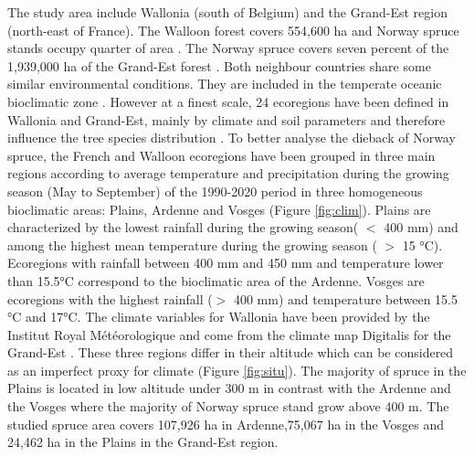 \documentclass[3p,procedia]{elsarticle}
\begin{document}
The study area include Wallonia (south of Belgium) and the Grand-Est region (north-east of France).
The Walloon forest covers 554,600 ha and  Norway spruce stands occupy quarter of area \citep{lejeune_ep_2022}.  
The Norway spruce covers seven percent of the 1,939,000 ha of the Grand-Est forest \citep{IGN2022}. 
Both neighbour countries share some similar environmental conditions.
They are included in the temperate oceanic bioclimatic zone \citep{lindner_climate_2010}.
However at a finest scale, 24 ecoregions have been defined in  Wallonia and Grand-Est, mainly by climate and soil parameters and therefore influence the tree species distribution \citep{walthert_tree_2017}.
To better analyse the dieback of Norway spruce, the French and Walloon ecoregions have been grouped in three main regions according to average temperature and precipitation during the growing season (May to September) of the 1990-2020 period in three homogeneous bioclimatic areas: Plains, Ardenne and Vosges (Figure \ref{fig:clim}).
Plains are characterized by the lowest rainfall during the growing season( $<$ 400 mm) and among the highest mean temperature during the growing season ( $>$ 15 °C).
Ecoregions with rainfall between 400 mm and 450 mm and temperature lower than 15.5°C correspond to the bioclimatic area of the Ardenne.
Vosges are ecoregions with the highest rainfall ($>$ 400 mm) and temperature between 15.5 °C and 17°C.
The climate variables for Wallonia have been provided by the Institut Royal Météorologique and come from the climate map Digitalis for the Grand-Est \citep{piedallu_presentation_2014}.
These three regions differ in their altitude which can be considered as an imperfect proxy for climate (Figure \ref{fig:situ}). 
The majority of spruce in the Plains is located in low altitude under 300 m in contrast with the Ardenne and the Vosges where the majority of Norway spruce stand grow above 400 m. 
The studied spruce area covers 107,926 ha in Ardenne,75,067 ha in the Vosges and  24,462 ha in the Plains in the Grand-Est region.
\end{document}
